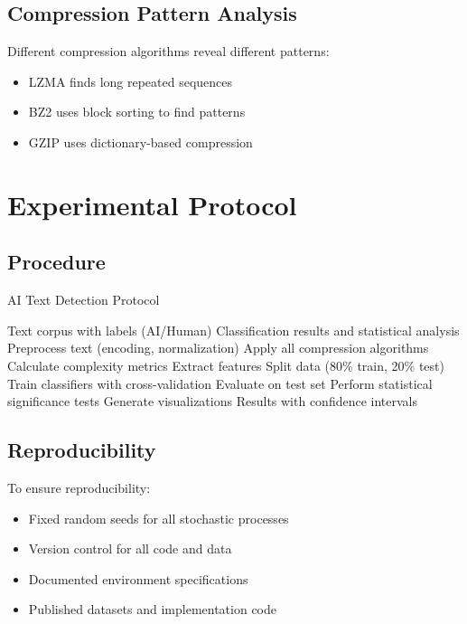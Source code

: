 \documentclass[12pt,a4paper]{report}
\begin{document}
\subsection{Compression Pattern Analysis}

Different compression algorithms reveal different patterns:
\begin{itemize}
    \item LZMA finds long repeated sequences
    \item BZ2 uses block sorting to find patterns
    \item GZIP uses dictionary-based compression
\end{itemize}

\section{Experimental Protocol}

\subsection{Procedure}

\begin{algorithm}
\caption{AI Text Detection Protocol}
\begin{algorithmic}[1]
\REQUIRE Text corpus with labels (AI/Human)
\ENSURE Classification results and statistical analysis
    \STATE Preprocess text (encoding, normalization)
    \STATE Apply all compression algorithms
    \STATE Calculate complexity metrics
    \STATE Extract features
\ENDFOR
\STATE Split data (80\% train, 20\% test)
\STATE Train classifiers with cross-validation
\STATE Evaluate on test set
\STATE Perform statistical significance tests
\STATE Generate visualizations
\RETURN Results with confidence intervals
\end{algorithmic}
\end{algorithm}

\subsection{Reproducibility}

To ensure reproducibility:
\begin{itemize}
    \item Fixed random seeds for all stochastic processes
    \item Version control for all code and data
    \item Documented environment specifications
    \item Published datasets and implementation code
\end{itemize}
\end{document}
